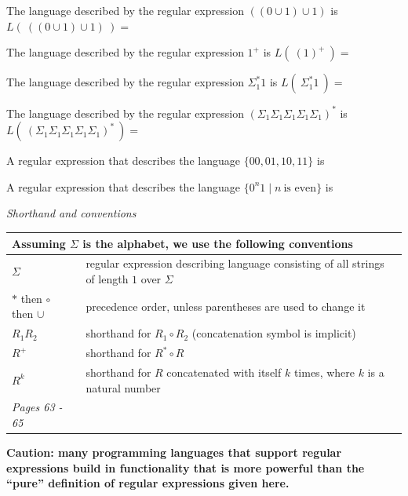 \documentclass[12pt, oneside]{article}
\begin{document}
The language described by the regular expression $((0 \cup 1) \cup 1)$ is $L(~((0 \cup 1) \cup 1)~) = $

\vfill

The language described by the regular expression $1^+$ is $L(~(1)^+~) = $

\vfill

The language described by the regular expression $\Sigma_1^* 1$ is $L(~\Sigma_1^* 1~) = $

\vfill

The language described by the regular expression $(\Sigma_1 \Sigma_1 \Sigma_1 \Sigma_1 \Sigma_1)^*$ 
is $L(~(\Sigma_1 \Sigma_1 \Sigma_1 \Sigma_1 \Sigma_1)^*~) = $

\vfill

A regular expression that describes the language $\{00, 01, 10, 11\}$ is 

\vfill

A regular expression that describes the language $\{ 0^n1 \mid n~\text{is even} \}$ is

\vfill

{\it Shorthand and conventions}
    
\begin{center}
    \begin{tabular}{|ll|}
    \hline
    \multicolumn{2}{|l|}{Assuming $\Sigma$ is the alphabet, we use the following conventions}\\
    \hline
    $\Sigma$   & regular  expression describing language consisting of  all strings  of length  $1$ over $\Sigma$\\
    $*$ then $\circ$ then $\cup$   & precedence order, unless parentheses are used to change it\\
    $R_1R_2$ & shorthand  for  $R_1  \circ R_2$ (concatenation symbol is implicit) \\
    $R^+$ & shorthand for $R^* \circ R$ \\
    $R^k$ & shorthand for $R$ concatenated with itself $k$ times, where $k$ is a natural number\\
    \hline
    {\it Pages 63 - 65 }& \\
    \hline
    \end{tabular}
\end{center}

\newpage
{\bf Caution: many programming languages that support regular expressions build in functionality
that is more powerful than the ``pure'' definition of regular expressions given here. }
\end{document}

